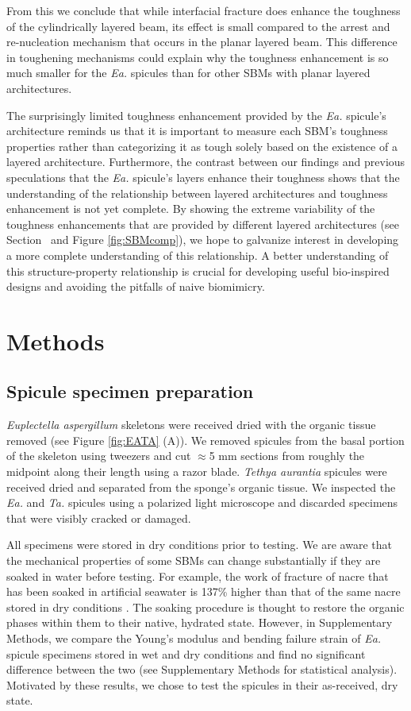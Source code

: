 \documentclass[12pt,onecolumn]{article}
\makeatletter
\DeclareRobustCommand*{\nameref}[1]{%
      \emph{\myorg@nameref{#1}}%
    }%
\newcommand{\TA}{\textit{Ta.\@}\xspace}
\newcommand{\EA}{\textit{Ea.\@}\xspace}
\makeatother
\begin{document}
From this we conclude that while interfacial fracture does enhance the toughness of the cylindrically layered beam, its effect is small compared to the arrest and re-nucleation mechanism that occurs in the planar layered beam. This difference in toughening mechanisms could explain why the toughness enhancement is so much smaller for the \EA spicules than for other SBMs with planar layered architectures.
	
The surprisingly limited toughness enhancement provided by the \EA spicule's architecture reminds us that it is important to measure each SBM's toughness properties rather than categorizing it as tough solely based on the existence of a layered architecture. Furthermore, the contrast between our findings and previous speculations that the \EA spicule's layers enhance their toughness shows that the understanding of the relationship between layered architectures and toughness enhancement is not yet complete. By showing the extreme variability of the toughness enhancements that are provided by different layered architectures (see Section~\nameref{sec:Rcomp} and Figure \ref{fig:SBMcomp}), we hope to galvanize interest in developing a more complete understanding of this relationship. A better understanding of this structure-property relationship is crucial for developing useful bio-inspired designs and avoiding the pitfalls of naive biomimicry. 

\section*{Methods}
\label{sec:methods}

\subsection*{Spicule specimen preparation}
\label{sec:sampleprep}
\textit{Euplectella aspergillum} skeletons were received dried with the organic tissue removed (see Figure \ref{fig:EATA} (A)). We removed spicules from the basal portion of the skeleton using tweezers and cut $\approx$5 mm sections from roughly the midpoint along their length using a razor blade. \textit{Tethya aurantia} spicules were received dried and separated from the sponge's organic tissue. We inspected the \EA and \TA spicules using a polarized light microscope and discarded specimens that were visibly cracked or damaged. 

All specimens were stored in dry conditions prior to testing. We are aware that the mechanical properties of some SBMs can change substantially if they are soaked in water before testing. For example, the work of fracture of nacre that has been soaked in artificial seawater is 137\% higher than that of the same nacre stored in dry conditions \cite{jackson1988}. The soaking procedure is thought to restore the organic phases within them to their native, hydrated state.  However, in Supplementary Methods, we compare the Young's modulus and bending failure strain of \EA spicule specimens stored in wet and dry conditions and find no significant difference between the two (see Supplementary Methods for statistical analysis). Motivated by these results, we chose to test the spicules in their as-received, dry state.
\end{document}
